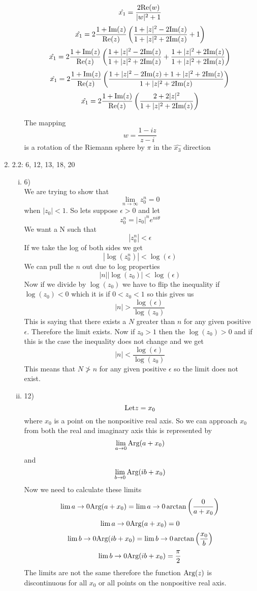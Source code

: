 \documentclass[11pt]{article}
\newcommand{\Arg}{\textnormal{Arg}}
\begin{document}
\begin{enumerate}
\begin{enumerate}[(i)]
$$\hat{x_1} = \frac{2 \textnormal{Re}(w)}{|w|^2 +1}$$
$$\hat{x_1} = 2 \frac{1+\textnormal{Im}(z)}{\textnormal{Re}(z)}\left(\frac{1+|z|^2-2\textnormal{Im}(z)}{1+|z|^2 +2\textnormal{Im}(z)} + 1\right)$$
$$\hat{x_1} = 2 \frac{1+\textnormal{Im}(z)}{\textnormal{Re}(z)}\left(\frac{1+|z|^2-2\textnormal{Im}(z)}{1+|z|^2 +2\textnormal{Im}(z)} + \frac{1+|z|^2 +2\textnormal{Im}(z)}{1+|z|^2 +2\textnormal{Im}(z)}\right)$$
$$\hat{x_1} = 2 \frac{1+\textnormal{Im}(z)}{\textnormal{Re}(z)}\left(\frac{1+|z|^2-2\textnormal{Im}(z)+1+|z|^2 +2\textnormal{Im}(z)}{1+|z|^2 +2\textnormal{Im}(z)}\right)$$
$$\hat{x_1} = 2 \frac{1+\textnormal{Im}(z)}{\textnormal{Re}(z)}\left(\frac{2+2|z|^2}{1+|z|^2 +2\textnormal{Im}(z)}\right)$$

The mapping 
$$w = \frac{1-iz}{z-i}$$
is a rotation of the Riemann sphere by $\pi$ in the $\hat{x_3}$ direction

\end{enumerate}

\item 2.2: 6, 12, 13, 18, 20
\begin{enumerate}[(i)]
\item 6)\\
We are trying to show that $$\lim_{n\rightarrow \infty} z_0^n = 0$$
when $|z_0| < 1$. So lets suppose $\epsilon > 0$ and let $$z_0^n = |z_0|^n e^{ni\theta}$$
We want a N such that 
$$|z_0^n| < \epsilon$$
If we take the log of both sides we get
$$|\log(z_0^n)| < \log(\epsilon)$$
We can pull the $n$ out due to log properties
$$|n||\log(z_0)| < \log(\epsilon)$$
Now if we divide by $\log(z_0)$ we have to flip the inequality if $\log(z_0) < 0$ which it is if $0 < z_0<1$ so this gives us 
$$|n|> \frac{\log(\epsilon)}{\log(z_0)}$$
This is saying that there exists a $N$ greater than $n$ for any given positive $\epsilon$. Therefore the limit exists. Now if $z_0 > 1$ then the $\log(z_0) > 0$ and if this is the case the inequality does not change and we get 
$$|n|< \frac{\log(\epsilon)}{\log(z_0)}$$
This means that $N \ngtr n$ for any given positive $\epsilon$ so the limit does not exist.
\item 12)\\
$$\textnormal{Let} z = x_0$$ where $x_0$ is a point on the nonpositive real axis. So we can approach $x_0$ from both the real and imaginary axis this is represented by
$$\lim_{a\rightarrow 0} \Arg(a+x_0)$$
and
$$\lim_{b\rightarrow 0} \Arg(ib+x_0)$$
Now we need to calculate these limits
$$\lim{a\rightarrow 0} \Arg(a+x_0) = \lim{a\rightarrow 0} \arctan\left(\frac{0}{a+x_0}\right)$$
$$\lim{a\rightarrow 0} \Arg(a+x_0) = 0$$
$$\lim{b\rightarrow 0} \Arg(ib+x_0) = \lim{b\rightarrow 0} \arctan\left(\frac{x_0}{b}\right)$$
$$\lim{b\rightarrow 0} \Arg(ib+x_0) = \frac{\pi}{2}$$
The limits are not the same therefore the function $\Arg(z)$ is discontinuous for all $x_0$ or all points on the nonpositive real axis.


\end{enumerate}
\end{enumerate}
\end{document}
